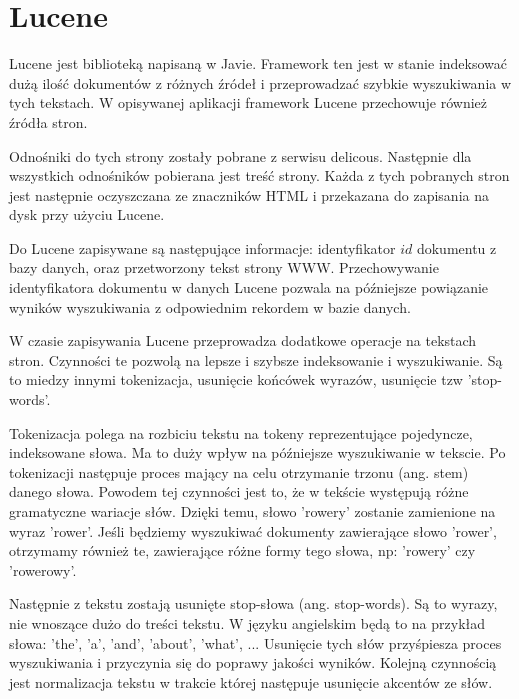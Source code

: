 \section{Lucene}


Lucene jest biblioteką napisaną w Javie. Framework ten jest w stanie indeksować dużą ilość dokumentów z różnych źródeł i przeprowadzać szybkie wyszukiwania w tych tekstach. W opisywanej aplikacji framework Lucene przechowuje również źródła stron. 

Odnośniki do tych strony zostały pobrane z  serwisu delicous. Następnie dla wszystkich odnośników pobierana jest treść strony. Każda z tych pobranych stron jest następnie oczyszczana ze znaczników HTML i przekazana do zapisania na dysk przy użyciu Lucene.

Do Lucene zapisywane są następujące informacje: identyfikator $id$ dokumentu z bazy danych, oraz przetworzony tekst strony WWW. Przechowywanie identyfikatora dokumentu w danych Lucene pozwala na  późniejsze powiązanie wyników wyszukiwania z odpowiednim rekordem w bazie danych. 

W czasie zapisywania Lucene przeprowadza dodatkowe operacje na tekstach stron. Czynności te pozwolą na lepsze i szybsze indeksowanie i wyszukiwanie. Są to miedzy innymi tokenizacja, usunięcie końcówek wyrazów, usunięcie tzw 'stop-words'. 





Tokenizacja polega na rozbiciu tekstu na tokeny reprezentujące pojedyncze, indeksowane słowa. Ma to duży wpływ na późniejsze wyszukiwanie w tekscie. Po tokenizacji następuje proces mający na celu otrzymanie trzonu (ang. stem) danego słowa. Powodem tej czynności jest to, że w tekście występują różne gramatyczne wariacje słów. Dzięki temu, słowo 'rowery' zostanie  zamienione na wyraz 'rower'. Jeśli będziemy wyszukiwać dokumenty zawierające słowo 'rower', otrzymamy również te, zawierające różne formy tego słowa, np: 'rowery' czy 'rowerowy'. 

Następnie z tekstu zostają usunięte stop-słowa (ang. stop-words). Są to wyrazy, nie wnoszące dużo do treści tekstu. W języku angielskim będą to na przykład słowa: 'the', 'a', 'and', 'about', 'what', ... Usunięcie tych słów przyśpiesza proces wyszukiwania i przyczynia się do poprawy jakości wyników.  Kolejną czynnością jest normalizacja tekstu w trakcie której następuje usunięcie akcentów ze słów. 


